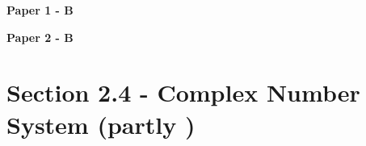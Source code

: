 \documentclass[12pt, a4paper]{article}
\begin{document}
\textbf{Paper 1 - B}
\begin{enumx}[label=\arabic*.,start=7]
\item {}\label{DSE2017-CoreP1-Q18} 
\item {}\label{DSE2023-CoreP1-Q16} 
\end{enumx}
\textbf{Paper 2 - B}
\begin{enumx}[label=\arabic*.,start=9]
\item {}\label{DSE2012P-CoreP2-Q33} 
\item {}\label{DSE2013-CoreP2-Q35} 
\item {}\label{DSE2015-CoreP2-Q34} 
\item {}\label{DSE2018-CoreP2-Q36} 
\end{enumx}




\section*{Section 2.4 - Complex Number System (partly \NF)}\label{section:4-2-4}
\end{document}
